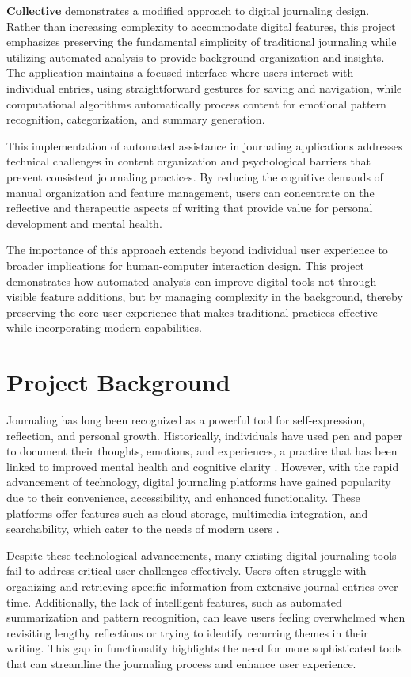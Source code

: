 \textbf{Collective} demonstrates a modified approach to digital journaling design. Rather than increasing complexity to accommodate digital features, this project emphasizes preserving the fundamental simplicity of traditional journaling while utilizing automated analysis to provide background organization and insights. The application maintains a focused interface where users interact with individual entries, using straightforward gestures for saving and navigation, while computational algorithms automatically process content for emotional pattern recognition, categorization, and summary generation.

This implementation of automated assistance in journaling applications addresses technical challenges in content organization and psychological barriers that prevent consistent journaling practices. By reducing the cognitive demands of manual organization and feature management, users can concentrate on the reflective and therapeutic aspects of writing that provide value for personal development and mental health.

The importance of this approach extends beyond individual user experience to broader implications for human-computer interaction design. This project demonstrates how automated analysis can improve digital tools not through visible feature additions, but by managing complexity in the background, thereby preserving the core user experience that makes traditional practices effective while incorporating modern capabilities.

\section{Project Background}\label{sec:background}

Journaling has long been recognized as a powerful tool for self-expression, reflection, and personal growth. Historically, individuals have used pen and paper to document their thoughts, emotions, and experiences, a practice that has been linked to improved mental health and cognitive clarity \cite{pennebaker1999forming}. However, with the rapid advancement of technology, digital journaling platforms have gained popularity due to their convenience, accessibility, and enhanced functionality. These platforms offer features such as cloud storage, multimedia integration, and searchability, which cater to the needs of modern users \cite{sloan2015efficacy}.

Despite these technological advancements, many existing digital journaling tools fail to address critical user challenges effectively. Users often struggle with organizing and retrieving specific information from extensive journal entries over time. Additionally, the lack of intelligent features, such as automated summarization and pattern recognition, can leave users feeling overwhelmed when revisiting lengthy reflections or trying to identify recurring themes in their writing. This gap in functionality highlights the need for more sophisticated tools that can streamline the journaling process and enhance user experience.

